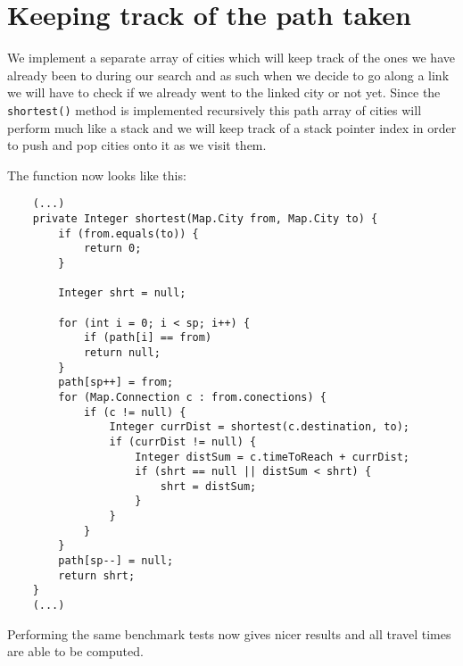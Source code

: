 \documentclass[a4paper,11pt]{article}
\begin{document}
\section*{Keeping track of the path taken}

We implement a separate array of cities which will keep track of the ones we have already been to during our search and as such when we decide to go along a link we will have to check if we already went to the linked city or not yet. Since the {\tt shortest()} method is implemented recursively this path array of cities will perform much like a stack and we will keep track of a stack pointer index in order to push and pop cities onto it as we visit them. 

The function now looks like this:

\begin{verbatim}
    (...)
    private Integer shortest(Map.City from, Map.City to) {
        if (from.equals(to)) {
            return 0;
        }
        
        Integer shrt = null;

        for (int i = 0; i < sp; i++) {
            if (path[i] == from)
            return null;
        }
        path[sp++] = from;
        for (Map.Connection c : from.conections) {
            if (c != null) {
                Integer currDist = shortest(c.destination, to);
                if (currDist != null) {
                    Integer distSum = c.timeToReach + currDist;
                    if (shrt == null || distSum < shrt) {
                        shrt = distSum;
                    }
                }
            }
        }
        path[sp--] = null;
        return shrt;
    }
    (...)
\end{verbatim}

Performing the same benchmark tests now gives nicer results and all travel times are able to be computed.
\end{document}
